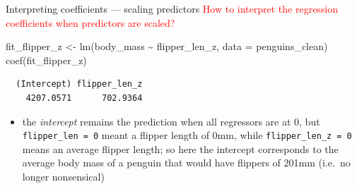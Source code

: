 \documentclass[
  10pt,
  ignorenonframetext,
  aspectratio=169,
  t]{beamer}
\newenvironment{Shaded}{\begin{snugshade}}{\end{snugshade}}
\newcommand{\AttributeTok}[1]{\textcolor[rgb]{0.40,0.45,0.13}{#1}}
\newcommand{\FunctionTok}[1]{\textcolor[rgb]{0.28,0.35,0.67}{#1}}
\newcommand{\NormalTok}[1]{\textcolor[rgb]{0.00,0.23,0.31}{#1}}
\newcommand{\OtherTok}[1]{\textcolor[rgb]{0.00,0.23,0.31}{#1}}
\newcommand{\SpecialCharTok}[1]{\textcolor[rgb]{0.37,0.37,0.37}{#1}}
\providecommand{\tightlist}{%
  \setlength{\itemsep}{0pt}\setlength{\parskip}{0pt}}
\newcommand{\blueit}[1]{\textcolor{bluebeamer}{\emph{#1}}}
\let\oldtexttt\texttt
\renewcommand{\texttt}[1]{\colorbox{gray!20}{\oldtexttt{#1}}}
\begin{document}
\begin{frame}[fragile]{Interpreting coefficients --- scaling predictors}
\protect{}\label{interpreting-coefficients-scaling-predictors-1}
\textcolor{red}{How to interpret the regression coefficients when predictors are scaled?}

\footnotesize

\begin{Shaded}
\begin{Highlighting}[]
\NormalTok{fit\_flipper\_z }\OtherTok{\textless{}{-}} \FunctionTok{lm}\NormalTok{(body\_mass }\SpecialCharTok{\textasciitilde{}}\NormalTok{ flipper\_len\_z, }\AttributeTok{data =}\NormalTok{ penguins\_clean)}
\FunctionTok{coef}\NormalTok{(fit\_flipper\_z)}
\end{Highlighting}
\end{Shaded}

\begin{verbatim}
  (Intercept) flipper_len_z 
    4207.0571      702.9364 
\end{verbatim}

\normalsize

\begin{itemize}
\tightlist
\item
  the \blueit{intercept} remains the prediction when all regressors are
  at 0, but \texttt{flipper\_len\ =\ 0} meant a flipper length of 0mm,
  while \texttt{flipper\_len\_z\ =\ 0} means an average flipper length;
  so here the intercept corresponds to the average body mass of a
  penguin that would have flippers of 201mm (i.e.~no longer nonsensical)
\end{itemize}
\end{frame}
\end{document}

